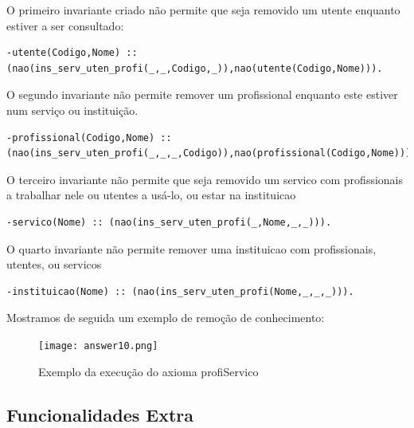 O primeiro invariante criado não permite que seja removido um utente enquanto estiver a ser consultado: 

\begin{Verbatim}
-utente(Codigo,Nome) :: (nao(ins_serv_uten_profi(_,_,Codigo,_)),nao(utente(Codigo,Nome))).
\end{Verbatim}

O segundo invariante não permite remover um profissional enquanto este estiver num serviço ou instituição. 

\begin{Verbatim}
-profissional(Codigo,Nome) :: (nao(ins_serv_uten_profi(_,_,_,Codigo)),nao(profissional(Codigo,Nome))).
\end{Verbatim}

O terceiro invariante não permite  que seja removido um servico com profissionais a trabalhar nele ou utentes a usá-lo, ou estar na instituicao

\begin{Verbatim}
-servico(Nome) :: (nao(ins_serv_uten_profi(_,Nome,_,_))).
\end{Verbatim}

O quarto invariante não permite remover uma instituicao com profissionais, utentes, ou servicos
\begin{Verbatim}
-instituicao(Nome) :: (nao(ins_serv_uten_profi(Nome,_,_,_))).
\end{Verbatim}

Mostramos de seguida um exemplo de remoção de conhecimento: 

\begin{figure}[<+htpb+>]
	\centering
	\texttt{[image: answer10.png]}
	\caption{Exemplo da execução do axioma profiServico}
	\label{p3:fig:output10}
\end{figure}

\newpage

\subsection{Funcionalidades Extra}
